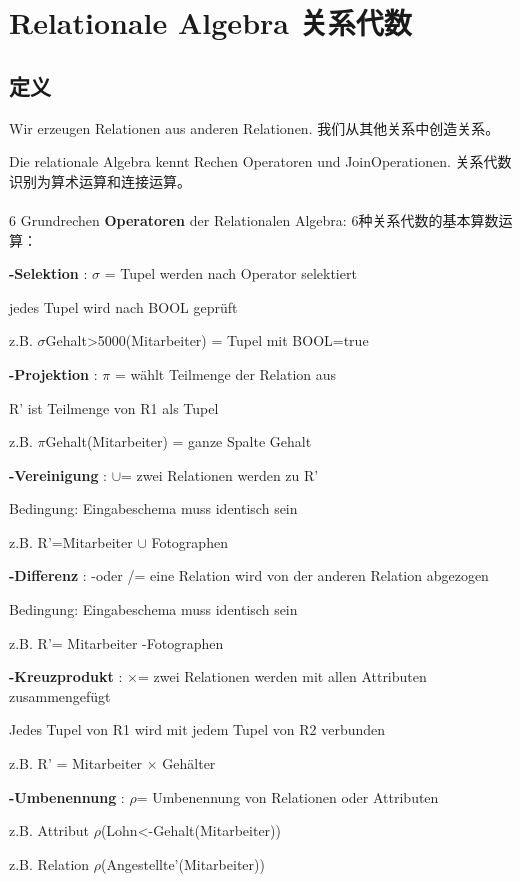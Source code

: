 \documentclass[fleqn]{article}
\begin{document}
\section{Relationale Algebra 关系代数}

\subsection{定义}

Wir erzeugen Relationen aus anderen Relationen. 我们从其他关系中创造关系。

Die relationale Algebra kennt Rechen Operatoren und JoinOperationen. 关系代数识别为算术运算和连接运算。
\\
\\
6 Grundrechen \textbf{Operatoren} der Relationalen Algebra: 6种关系代数的基本算数运算：

\noindent \textbf{-Selektion} : $\sigma$ = Tupel werden nach Operator selektiert 

jedes Tupel wird nach BOOL geprüft

z.B. $\sigma$Gehalt>5000(Mitarbeiter) = Tupel mit BOOL=true

\noindent \textbf{-Projektion} : $\pi$ = wählt Teilmenge der Relation aus

R' ist Teilmenge von R1 als Tupel

z.B. $\pi$Gehalt(Mitarbeiter) = ganze Spalte Gehalt

\noindent \textbf{-Vereinigung} : $\cup$= zwei Relationen werden zu R'

Bedingung: Eingabeschema muss identisch sein

z.B. R'=Mitarbeiter $\cup$ Fotographen

\noindent \textbf{-Differenz} : -oder /= eine Relation wird von der anderen Relation abgezogen

Bedingung: Eingabeschema muss identisch sein

z.B. R'= Mitarbeiter -Fotographen

\noindent \textbf{-Kreuzprodukt} : $\times$= zwei Relationen werden mit allen Attributen zusammengefügt

Jedes Tupel von R1 wird mit jedem Tupel von R2 verbunden

z.B. R' = Mitarbeiter $\times$ Gehälter

\noindent \textbf{-Umbenennung} : $\rho$= Umbenennung von Relationen oder Attributen

z.B. Attribut $\rho$(Lohn<-Gehalt(Mitarbeiter))

z.B. Relation $\rho$(Angestellte'(Mitarbeiter))
\end{document}
